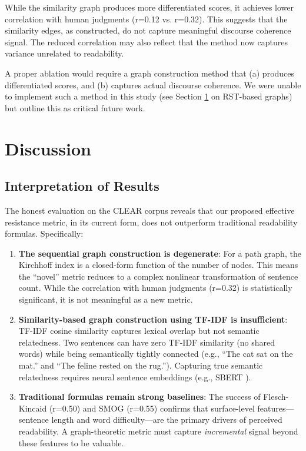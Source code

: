 \documentclass[11pt,letterpaper]{article}
\begin{document}
While the similarity graph produces more differentiated scores, it achieves lower correlation with human judgments (r=0.12 vs. r=0.32). This suggests that the similarity edges, as constructed, do not capture meaningful discourse coherence signal. The reduced correlation may also reflect that the method now captures variance unrelated to readability.

A proper ablation would require a graph construction method that (a) produces differentiated scores, and (b) captures actual discourse coherence. We were unable to implement such a method in this study (see Section \ref{sec:future} on RST-based graphs) but outline this as critical future work.

\section{Discussion}
\label{sec:future}

\subsection{Interpretation of Results}

The honest evaluation on the CLEAR corpus reveals that our proposed effective resistance metric, in its current form, does not outperform traditional readability formulas. Specifically:

\begin{enumerate}
    \item \textbf{The sequential graph construction is degenerate}: For a path graph, the Kirchhoff index is a closed-form function of the number of nodes. This means the ``novel'' metric reduces to a complex nonlinear transformation of sentence count. While the correlation with human judgments (r=0.32) is statistically significant, it is not meaningful as a new metric.
    
    \item \textbf{Similarity-based graph construction using TF-IDF is insufficient}: TF-IDF cosine similarity captures lexical overlap but not semantic relatedness. Two sentences can have zero TF-IDF similarity (no shared words) while being semantically tightly connected (e.g., ``The cat sat on the mat.'' and ``The feline rested on the rug.''). Capturing true semantic relatedness requires neural sentence embeddings (e.g., SBERT \cite{Reimers2019}).
    
    \item \textbf{Traditional formulas remain strong baselines}: The success of Flesch-Kincaid (r=0.50) and SMOG (r=0.55) confirms that surface-level features---sentence length and word difficulty---are the primary drivers of perceived readability. A graph-theoretic metric must capture \textit{incremental} signal beyond these features to be valuable.
\end{enumerate}
\end{document}
